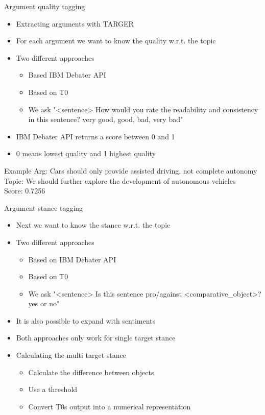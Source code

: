 \documentclass[english]{mlutalk}
\begin{document}
\begin{frame}{Argument quality tagging}
    \begin{itemize}
        \item Extracting arguments with TARGER~\cite{ChernodubOHBHBP2019}
        \item For each argument we want to know the quality w.r.t. the topic
        \item Two different approaches
        \begin{itemize}
            \item Based IBM Debater API~\cite{ToledoG2019}
            \item Based on T0
            \item We ask "<sentence>
            How would you rate the readability and consistency in this sentence? very good, good, bad, very bad"
        \end{itemize}
        \item IBM Debater API returns a score between 0 and 1
        \item 0 means lowest quality and 1 highest quality
    \end{itemize}
    \begin{block}{Example}
        Arg: Cars should only provide assisted driving, not complete autonomy\\
        Topic: We should further explore the development of autonomous vehicles\\
        Score: 0.7256
    \end{block}
\end{frame}

\begin{frame}{Argument stance tagging}
    \begin{itemize}
        \item Next we want to know the stance w.r.t. the topic
        \item Two different approaches
        \begin{itemize}
            \item Based on IBM Debater API~\cite{BarHaimBDSS2017}
            \item Based on T0
            \item We ask "<sentence> Is this sentence pro/against <comparative\_object>? yes or no"
        \end{itemize}
        \item It is also possible to expand with sentiments
        \item Both approaches only work for single target stance
        \item Calculating the multi target stance
        \begin{itemize}
            \item Calculate the difference between objects
            \item Use a threshold
            \item Convert T0s output into a numerical representation
        \end{itemize}
    \end{itemize}
\end{frame}
\end{document}
